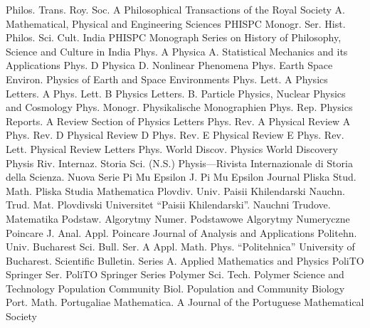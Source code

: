 {Philos. Trans. Roy. Soc. A}
{Philosophical Transactions of the Royal Society A. Mathematical, Physical and Engineering Sciences}
{PHISPC Monogr. Ser. Hist. Philos. Sci. Cult. India}
{PHISPC Monograph Series on History of Philosophy, Science and Culture in India}
{Phys. A}
{Physica A. Statistical Mechanics and its Applications}
{Phys. D}
{Physica D. Nonlinear Phenomena}
{Phys. Earth Space Environ.}
{Physics of Earth and Space Environments}
{Phys. Lett. A}
{Physics Letters. A}
{Phys. Lett. B}
{Physics Letters. B. Particle Physics, Nuclear Physics and Cosmology}
{Phys. Monogr.}
{Physikalische Monographien}
{Phys. Rep.}
{Physics Reports. A Review Section of Physics Letters}
{Phys. Rev. A}
{Physical Review A}
{Phys. Rev. D}
{Physical Review D}
{Phys. Rev. E}
{Physical Review E}
{Phys. Rev. Lett.}
{Physical Review Letters}
{Phys. World Discov.}
{Physics World Discovery}
{Physis Riv. Internaz. Storia Sci. (N.S.)}
{Physis---Rivista Internazionale di Storia della Scienza. Nuova Serie}
{Pi Mu Epsilon J.}
{Pi Mu Epsilon Journal}
{Pliska Stud. Math.}
{Pliska Studia Mathematica}
{Plovdiv. Univ. Paisii Khilendarski Nauchn. Trud. Mat.}
{Plovdivski Universitet ``Paisii Khilendarski''. Nauchni Trudove. Matematika}
{Podstaw. Algorytmy Numer.}
{Podstawowe Algorytmy Numeryczne}
{Poincare J. Anal. Appl.}
{Poincare Journal of Analysis and Applications}
{Politehn. Univ. Bucharest Sci. Bull. Ser. A Appl. Math. Phys.}
{``Politehnica'' University of Bucharest. Scientific Bulletin. Series A. Applied Mathematics and Physics}
{PoliTO Springer Ser.}
{PoliTO Springer Series}
{Polymer Sci. Tech.}
{Polymer Science and Technology}
{Population Community Biol.}
{Population and Community Biology}
{Port. Math.}
{Portugaliae Mathematica. A Journal of the Portuguese Mathematical Society}
